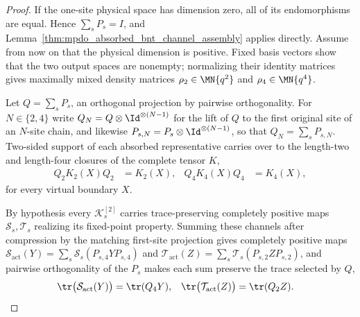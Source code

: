 \begin{proof}\leanok
    If the one-site physical space has dimension zero, all of its endomorphisms
    are equal. Hence $\sum_sP_s=I$, and
    Lemma~\ref{thm:mpdo_absorbed_bnt_channel_assembly} applies directly.
    Assume from now on that the physical dimension is positive. Fixed basis
    vectors show that the two output spaces are nonempty; normalizing
    their identity matrices gives maximally mixed density matrices
    $\rho_2\in\MN{q^2}$ and $\rho_4\in\MN{q^4}$.

    Let $Q=\sum_sP_s$, an orthogonal projection by pairwise orthogonality.
    For $N\in\{2,4\}$ write $Q_N=Q\otimes\Id^{\otimes(N-1)}$ for the lift of
    $Q$ to the first original site of an $N$-site chain, and likewise
    $P_{s,N}=P_s\otimes\Id^{\otimes(N-1)}$, so that $Q_N=\sum_sP_{s,N}$.
    Two-sided support of each absorbed representative carries over to the
    length-two and length-four closures of the complete tensor $K$,
    \begin{align}
        Q_2K_2(X)Q_2 & =K_2(X), & Q_4K_4(X)Q_4 & =K_4(X),
        \label{eq:mpdo_support_completion_supported}
    \end{align}
    for every virtual boundary $X$.

    By hypothesis every $\mathcal K_s^{[2]}$ carries trace-preserving
    completely positive maps $\mathcal S_s,\mathcal T_s$ realizing its
    fixed-point property. Summing these channels after compression by the
    matching first-site projection gives completely positive maps
    $\mathcal S_{\mathrm{act}}(Y)=\sum_s\mathcal S_s(P_{s,4}YP_{s,4})$ and
    $\mathcal T_{\mathrm{act}}(Z)=\sum_s\mathcal T_s(P_{s,2}ZP_{s,2})$, and
    pairwise orthogonality of the $P_s$ makes each sum preserve the trace
    selected by $Q$,
    \begin{align}
        \tr\bigl(\mathcal S_{\mathrm{act}}(Y)\bigr) & =\tr(Q_4Y), &
        \tr\bigl(\mathcal T_{\mathrm{act}}(Z)\bigr) & =\tr(Q_2Z).
        \notag
    \end{align}


\end{proof}

